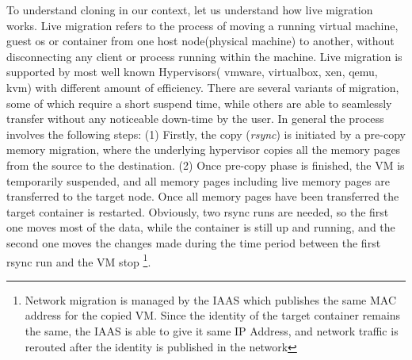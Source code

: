 To understand cloning in our context, let us understand how live migration works. 
Live migration refers to the process of moving a running virtual machine, guest os or container from one host node(physical machine) to another, without disconnecting any client or process running within the machine. 
Live migration is supported by most well known Hypervisors( vmware, virtualbox, xen, qemu, kvm) with different amount of efficiency.
There are several variants of migration, some of which require a short suspend time, while others are able to seamlessly transfer without any noticeable down-time by the user.
In general the process involves the following steps: 
(1) Firstly, the copy (\textit{rsync}) is initiated by a pre-copy memory migration, where the underlying hypervisor copies all the memory pages from the source to the destination. 
(2) Once pre-copy phase is finished, the VM is temporarily suspended, and all memory pages including live memory pages are transferred to the target node. 
Once all memory pages have been transferred the target container is restarted. 
Obviously, two rsync runs are needed, so the first one moves most of the data, while the container is still up and running, and the second one moves the changes made during the time period between the first rsync run and the VM stop
\footnote{Network migration is managed by the IAAS which publishes the same MAC address for the copied VM. 
Since the identity of the target container remains the same, the IAAS is able to give it same IP Address, and network traffic is rerouted after the identity is published in the network}.

